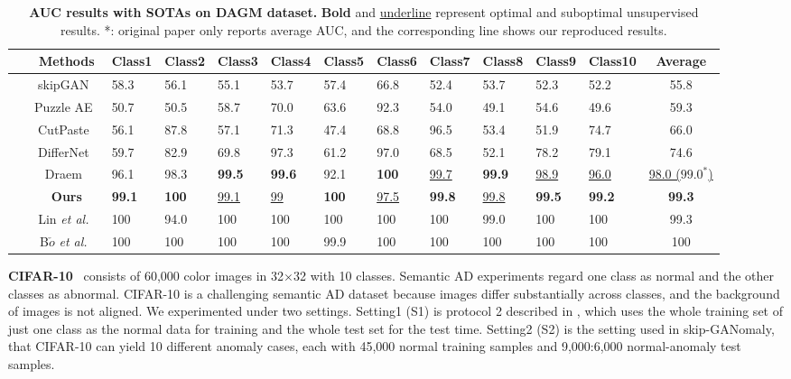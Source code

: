 \documentclass[lettersize,journal]{IEEEtran}
\begin{document}
\begin{table*}\normalsize
	\centering
	\small
	\renewcommand{\arraystretch}{1.1}
	\setlength\tabcolsep{8pt}
	\caption{\textbf{AUC results with SOTAs on DAGM dataset.} \textbf{Bold} and \underline{underline} represent optimal and suboptimal unsupervised results. *: original paper only reports average AUC, and the corresponding line shows our reproduced results.}
	\begin{tabular}{C{3pt} | c |C{20pt} C{20pt} C{20pt} C{20pt} C{20pt} C{20pt} C{20pt} C{20pt} C{20pt} C{23pt} |c}\hline
		\specialrule{0em}{1pt}{0pt}
		~ & Methods & Class1 & Class2 & Class3 & Class4 & Class5 & Class6 & Class7 & Class8 & Class9 & Class10 & Average\\
		\hline
		 & skipGAN~\cite{akccay2019skip} & 58.3 & 56.1 & 55.1 & 53.7 & 57.4 & 66.8 & 52.4 & 53.7 & 52.3 & 52.2 & 55.8\\
		~ & Puzzle AE~\cite{salehi2020puzzle} & 50.7 & 50.5 & 58.7 & 70.0 & 63.6 & 92.3 & 54.0 & 49.1 & 54.6 & 49.6 & 59.3\\
		~ & CutPaste~\cite{li2021cutpaste} & 56.1 & 87.8 & 57.1 & 71.3 & 47.4 & 68.8 & 96.5 & 53.4 & 51.9 & 74.7 & 66.0\\
		~ & DifferNet~\cite{rudolph2021same} & 59.7 & 82.9 & 69.8 & 97.3 & 61.2 & 97.0 & 68.5 & 52.1 & 78.2 & 79.1 & 74.6\\
		~ & Draem~\cite{zavrtanik2021draem} & 96.1 & 98.3 & \textbf{99.5} & \textbf{99.6} & 92.1 & \textbf{100} & \underline{99.7} & \textbf{99.9} & \underline{98.9} & \underline{96.0} & \underline{98.0 ($99.0^*$)}\\
		~ & \textbf{Ours} & \textbf{99.1} & \textbf{100} & \underline{99.1} & \underline{99} & \textbf{100} & \underline{97.5} & \textbf{99.8} & \underline{99.8} & \textbf{99.5} & \textbf{99.2} & \textbf{99.3}\\
		\hline
		 & Lin \textit{et al.}~\cite{lin2020efficient} & 100 & 94.0 & 100 & 100 & 100 & 100 & 100 & 99.0 & 100 & 100 & 99.3\\
		~ & B$\check{o}$ \textit{et al.}~\cite{bovzivc2021end} & 100 & 100 & 100 & 100 & 99.9 & 100 & 100 & 100 & 100 & 100 & 100\\
		\hline
	\end{tabular}
	\label{table:DGAM}
\end{table*}

\noindent\textbf{CIFAR-10}~\cite{krizhevsky2009learning} consists of 60,000 color images in 32$\times$32 with 10 classes. Semantic AD experiments regard one class as normal and the other classes as abnormal. CIFAR-10 is a challenging semantic AD dataset because images differ substantially across classes, and the background of images is not aligned. We experimented under two settings. Setting1 (S1) is protocol 2 described in \cite{perera2019ocgan}, which uses the whole training set of just one class as the normal data for training and the whole test set for the test time. Setting2 (S2) is the setting used in skip-GANomaly, that CIFAR-10 can yield 10 different anomaly cases, each with 45,000 normal training samples and 9,000:6,000 normal-anomaly test samples.
\end{document}

